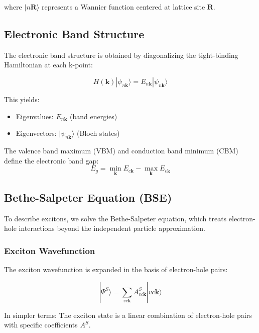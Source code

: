 \documentclass[11pt,a4paper]{article}
\newcommand{\ket}[1]{|#1\rangle}
\begin{document}
where $\ket{n\mathbf{R}}$ represents a Wannier function centered at lattice site $\mathbf{R}$.

\subsection{Electronic Band Structure}

The electronic band structure is obtained by diagonalizing the tight-binding Hamiltonian at each k-point:

\begin{equation}
H(\mathbf{k}) \ket{\psi_{n\mathbf{k}}} = E_{n\mathbf{k}} \ket{\psi_{n\mathbf{k}}}
\end{equation}

This yields:
\begin{itemize}
    \item Eigenvalues: $E_{n\mathbf{k}}$ (band energies)
    \item Eigenvectors: $\ket{\psi_{n\mathbf{k}}}$ (Bloch states)
\end{itemize}

The valence band maximum (VBM) and conduction band minimum (CBM) define the electronic band gap:
\begin{equation}
E_g = \min_{\mathbf{k}} E_{c\mathbf{k}} - \max_{\mathbf{k}} E_{v\mathbf{k}}
\end{equation}

\subsection{Bethe-Salpeter Equation (BSE)}

To describe excitons, we solve the Bethe-Salpeter equation, which treats electron-hole interactions beyond the independent particle approximation.

\subsubsection{Exciton Wavefunction}

The exciton wavefunction is expanded in the basis of electron-hole pairs:

\begin{equation}
\ket{\Psi^S} = \sum_{vc\mathbf{k}} A^S_{vc\mathbf{k}} \ket{vc\mathbf{k}}
\end{equation}

In simpler terms: The exciton state is a linear combination of electron-hole pairs with specific coefficients $A^S$.
\end{document}
